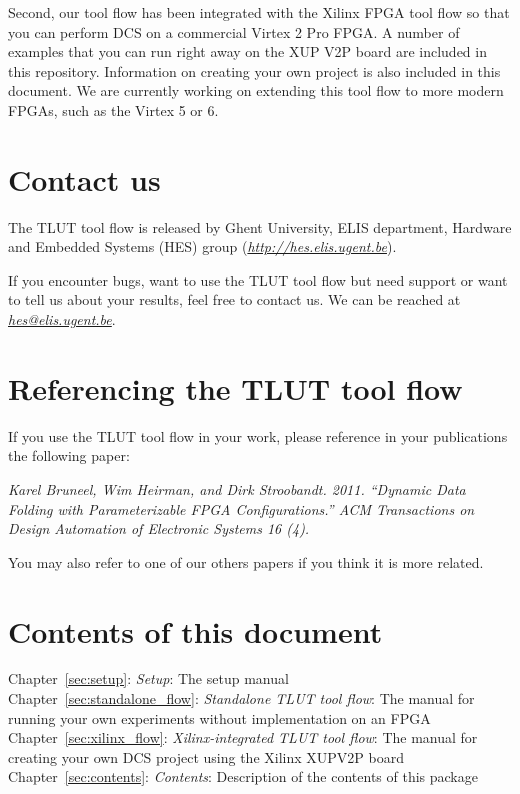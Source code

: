 \documentclass[a4paper,oneside]{memoir}
\begin{document}
Second, our tool flow has been integrated with the Xilinx FPGA tool flow so that you can perform DCS on a commercial Virtex 2 Pro FPGA.
A number of examples that you can run right away on the XUP V2P board are included in this repository. 
Information on creating your own project is also included in this document.
We are currently working on extending this tool flow to more modern FPGAs, such as the Virtex 5 or 6.

\section{Contact us}
The TLUT tool flow is released by Ghent University, ELIS department, Hardware and Embedded Systems (HES) group (\href{http://hes.elis.ugent.be}{\emph{http://hes.elis.ugent.be}}).

If you encounter bugs, want to use the TLUT tool flow but need support or want to tell us about your results, feel free to contact us.
We can be reached at \href{mailto:hes@elis.ugent.be}{\emph{hes@elis.ugent.be}}.

\section{Referencing the TLUT tool flow}
If you use the TLUT tool flow in your work, please reference in your publications the following paper:

\emph{Karel Bruneel, Wim Heirman, and Dirk Stroobandt. 2011. ``Dynamic Data Folding with Parameterizable FPGA Configurations.'' ACM Transactions on Design Automation of Electronic Systems 16 (4).}

You may also refer to one of our others papers if you think it is more related.

\section{Contents of this document}
Chapter~\ref{sec:setup}: \emph{Setup}: The setup manual\\
Chapter~\ref{sec:standalone_flow}: \emph{Standalone TLUT tool flow}: The manual for running your own experiments without implementation on an FPGA\\
Chapter~\ref{sec:xilinx_flow}: \emph{Xilinx-integrated TLUT tool flow}: The manual for creating your own DCS project using the Xilinx XUPV2P board\\
Chapter~\ref{sec:contents}: \emph{Contents}: Description of the contents of this package\\
\end{document}
